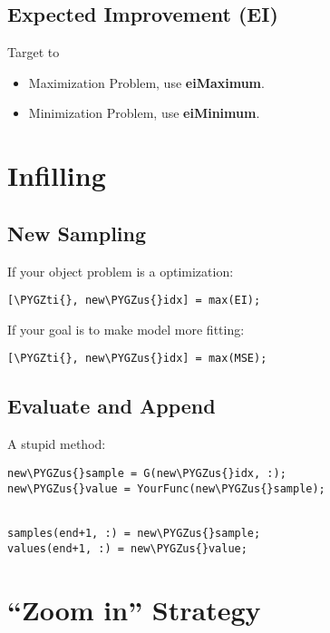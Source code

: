 \documentclass[letterpaper,10pt,english]{sphinxmanual}
\def\PYGZus{\char`\_}
\def\PYGZti{\char`\~}
\begin{document}
\section{Expected Improvement (EI)}
\label{modeling:expected-improvement-ei}
Target to
\begin{itemize}
\item {} 
Maximization Problem, use \textbf{eiMaximum}.

\item {} 
Minimization Problem, use \textbf{eiMinimum}.

\end{itemize}


\chapter{Infilling}
\label{infilling::doc}\label{infilling:infilling}

\section{New Sampling}
\label{infilling:new-sampling}
If your object problem is a optimization:

\begin{Verbatim}[commandchars=\\\{\}]
[\PYGZti{}, new\PYGZus{}idx] = max(EI);
\end{Verbatim}

If your goal is to make model more fitting:

\begin{Verbatim}[commandchars=\\\{\}]
[\PYGZti{}, new\PYGZus{}idx] = max(MSE);
\end{Verbatim}


\section{Evaluate and Append}
\label{infilling:evaluate-and-append}
A stupid method:

\begin{Verbatim}[commandchars=\\\{\}]
new\PYGZus{}sample = G(new\PYGZus{}idx, :);
new\PYGZus{}value = YourFunc(new\PYGZus{}sample);


samples(end+1, :) = new\PYGZus{}sample;
values(end+1, :) = new\PYGZus{}value;
\end{Verbatim}


\chapter{``Zoom in'' Strategy}
\label{zoomin::doc}\label{zoomin:zoom-in-strategy}
\end{document}
